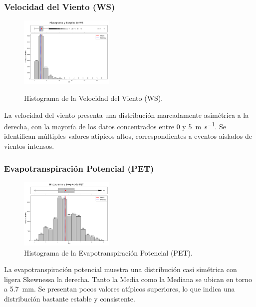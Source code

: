 \subsubsection*{Velocidad del Viento (WS)}

\begin{figure}[H]
    \caption{Histograma de la Velocidad del Viento (WS).}
    \centering
    \includegraphics[width=0.4\textwidth]{resultados/global/univariado/WS_histograma.png}
    \label{fig:WS_histograma}
\end{figure}

La velocidad del viento presenta una distribución marcadamente asimétrica a la derecha, con la mayoría de los datos concentrados entre 0 y \SI{5}{\meter\per\second}. Se identifican múltiples valores atípicos altos, correspondientes a eventos aislados de vientos intensos.

\newpage



\subsubsection{Evapotranspiración Potencial (PET)}

\begin{figure}[H]
    \centering
    \includegraphics[width=0.4\textwidth]{resultados/global/univariado/PET_histograma.png}
    \caption{Histograma de la Evapotranspiración Potencial (PET).}
    \label{fig:PET_histograma}
\end{figure}

La evapotranspiración potencial muestra una distribución casi simétrica con ligera Skewnessa la derecha. Tanto la Media como la Mediana se ubican en torno a \SI{5.7}{\milli\meter}. Se presentan pocos valores atípicos superiores, lo que indica una distribución bastante estable y consistente.

